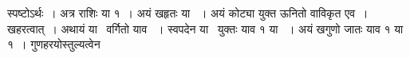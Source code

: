 \documentclass[11pt, openany]{book}
\begin{document}
\begin{sloppypar}
स्पष्टोऽर्थः~। अत्र राशिः या १~। अयं खहृतः या ~। अयं कोट्या युक्त ऊनितो वाविकृत एव~। खहरत्वात्~। अथायं या \, वर्गितो याव ~। स्वपदेन या \, युक्तः याव १ या ~। अयं खगुणो जातः याव १ या १~। गुणहरयोस्तुल्यत्वेन
\end{sloppypar}

\newpage
\end{document}
